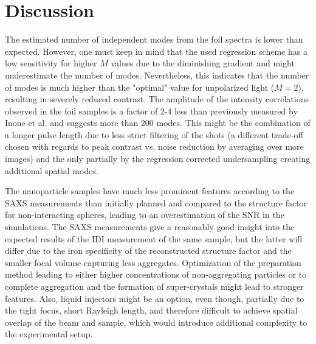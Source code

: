 \section{Discussion}

The estimated number of independent modes from the foil spectra is lower than expected. However, one must keep in mind that the used regression scheme has a low sensitivity for higher $M$ values due to the diminishing gradient and might underestimate the number of modes. Nevertheless, this indicates that the number of modes is much higher than the "optimal" value for unpolarized light ($M=2$), resulting in severely reduced contrast. The amplitude of the intensity correlations observed in the foil samples is a factor of 2-4 less than previously measured by Inoue et al. and suggests more than 200 modes. This might be the combination of a longer pulse length due to less strict filtering of the shots (a different trade-off chosen with regards to peak contrast vs. noise reduction by averaging over more images) and the only partially by the regression corrected undersampling creating additional spatial modes. 

The nanoparticle samples have much less prominent features according to the SAXS measurements than initially planned and compared to the structure factor for non-interacting spheres, leading to an overestimation of the SNR in the simulations. The SAXS measurements give a reasonably good insight into the expected results of the IDI measurement of the same sample, but the latter will differ due to the iron specificity of the reconstructed structure factor and the smaller focal volume capturing less aggregates. Optimization of the preparation method leading to either higher concentrations of non-aggregating particles or to complete aggregation and the formation of super-crystals might lead to stronger features. Also, liquid injectors might be an option, even though, partially due to the tight focus, short Rayleigh length, and therefore difficult to achieve spatial overlap of the beam and sample, which would introduce additional complexity to the experimental setup.

